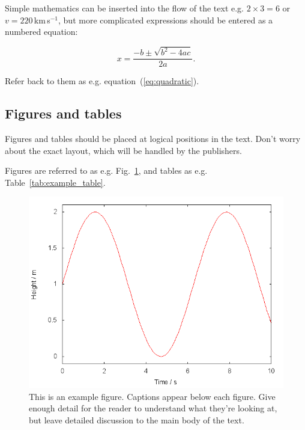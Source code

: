 \documentclass[fleqn,usenatbib]{mnras}
\begin{document}
Simple mathematics can be inserted into the flow of the text e.g. $2\times3=6$
or $v=220$\,km\,s$^{-1}$, but more complicated expressions should be entered
as a numbered equation:

\begin{equation}
    x=\frac{-b\pm\sqrt{b^2-4ac}}{2a}.
	\label{eq:quadratic}
\end{equation}

Refer back to them as e.g. equation~(\ref{eq:quadratic}).

\subsection{Figures and tables}

Figures and tables should be placed at logical positions in the text. Don't
worry about the exact layout, which will be handled by the publishers.

Figures are referred to as e.g. Fig.~\ref{fig:example_figure}, and tables as
e.g. Table~\ref{tab:example_table}.

\begin{figure}
	\includegraphics[width=\columnwidth]{example}
    \caption{This is an example figure. Captions appear below each figure.
	Give enough detail for the reader to understand what they're looking at,
	but leave detailed discussion to the main body of the text.}
    \label{fig:example_figure}
\end{figure}
\end{document}
